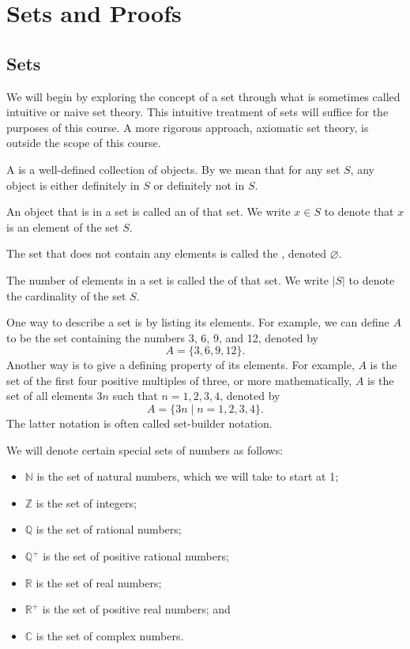 \chapter{Sets and Proofs}

\section{Sets}

We will begin by exploring the concept of a set through what is sometimes called intuitive or naive set theory. This intuitive treatment of sets will suffice for the purposes of this course. A more rigorous approach, axiomatic set theory, is outside the scope of this course.

\begin{defn}
A  is a well-defined collection of objects. By  we mean that for any set $ S $, any object is either definitely in $ S $ or definitely not in $ S $.

An object that is in a set is called an  of that set. We write $ x\in S $ to denote that $ x $ is an element of the set $ S $.

The set that does not contain any elements is called the , denoted $ \varnothing $.

The number of elements in a set is called the  of that set. We write $ \lvert S\rvert $ to denote the cardinality of the set $ S $.
\end{defn}

One way to describe a set is by listing its elements. For example, we can define $ A $ to be the set containing the numbers 3, 6, 9, and 12, denoted by
\begin{equation*}
    A=\{3,6,9,12\}.
\end{equation*}
Another way is to give a defining property of its elements. For example, $ A $ is the set of the first four positive multiples of three, or more mathematically, $ A $ is the set of all elements $ 3n $ such that $ n=1,2,3,4 $, denoted by
\begin{equation*}
    A=\{3n\mid n=1,2,3,4\}.
\end{equation*}
The latter notation is often called set-builder notation.

We will denote certain special sets of numbers as follows:
\begin{itemize}
    \item $ \mathbb{N} $ is the set of natural numbers, which we will take to start at 1;
    \item $ \mathbb{Z} $ is the set of integers;
    \item $ \mathbb{Q} $ is the set of rational numbers;
    \item $ \mathbb{Q}^+ $ is the set of positive rational numbers;
    \item $ \mathbb{R} $ is the set of real numbers;
    \item $ \mathbb{R}^+ $ is the set of positive real numbers; and
    \item $ \mathbb{C} $ is the set of complex numbers.
\end{itemize}


